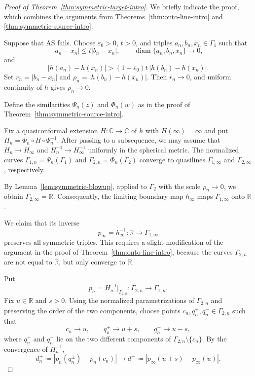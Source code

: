\documentclass[10pt,a4paper]{amsart}
\numberwithin{equation}{section}
\newcommand{\R}{\mathbb{R}}
\newcommand{\C}{\mathbb{C}}
\newcommand{\diam}{\operatorname{diam}}
\begin{document}
\begin{proof}[Proof of Theorem~\ref{thm:symmetric-target-intro}]
We briefly indicate the proof, which combines the arguments from Theorems~\ref{thm:onto-line-intro} and \ref{thm:symmetric-source-intro}.

Suppose that $\mathrm{AS}$ fails.  Choose $\varepsilon_0>0$, $t>0$, and triples $a_n,b_n,x_n\in\Gamma_1$ such that
\begin{equation}\label{eq:sym-target-failure}
 |a_n-x_n|\leq t|b_n-x_n|,\qquad \diam\{a_n,b_n,x_n\}\to0,
\end{equation}
and
\begin{equation}\label{eq:sym-target-image-failure}
 |h(a_n)-h(x_n)|>(1+\varepsilon_0)t\,|h(b_n)-h(x_n)|.
\end{equation}
Set $r_n=|b_n-x_n|$ and $\rho_n=|h(b_n)-h(x_n)|$.
Then $r_n\to0$, and uniform continuity of $h$ gives $\rho_n\to 0$.

Define the similarities $\Psi_n(z)$ and $\Phi_n(w)$ as in the proof of
Theorem~\ref{thm:symmetric-source-intro}.

Fix a quasiconformal extension $H\colon\C\to\C $ of $h$ with $H(\infty)=\infty$ and put $H_n=\Phi_n\circ H\circ \Psi_n^{-1}$.
After passing to a subsequence, we may assume that $H_n\to H_\infty$ and $H_n^{-1}\to H_\infty^{-1}$ uniformly in the spherical metric. 
The normalized curves $\Gamma_{1,n}=\Psi_n(\Gamma_1)$ and $\Gamma_{2,n}=\Phi_n(\Gamma_2)$ converge to quasilines $\Gamma_{1,\infty}$ and $\Gamma_{2,\infty}$, respectively.

By Lemma~\ref{lem:symmetric-blowup}, applied to $\Gamma_2$ with the scale $\rho_n\to0$, we obtain $\Gamma_{2,\infty}=\R$.
Consequently, the limiting boundary map $h_\infty$ maps $\Gamma_{1,\infty}$ onto $\mathbb R$.

We claim that its inverse
\[
 p_\infty=h_\infty^{-1}\colon\R\to\Gamma_{1,\infty}
\]
preserves all symmetric  triples.  
This requires a slight modification of the argument in the proof of Theorem~\ref{thm:onto-line-intro}, because the curves $\Gamma_{2,n}$ are not equal to $\R$, but only converge to $\R$.

Put
\[
 p_n=H_n^{-1}|_{\Gamma_{2,n}}\colon\Gamma_{2,n}\to\Gamma_{1,n}.
\]
Fix $u\in\R$ and $s>0$.  
Using the normalized parametrizations of $\Gamma_{2,n}$ and preserving the order of the two components, choose points $c_n,q_n^+,q_n^-\in\Gamma_{2,n}$ such that
\[
 c_n\to u,\qquad q_n^+\to u+s,\qquad q_n^-\to u-s,
\]
where $q_n^+$ and $q_n^-$ lie on the two different components of $\Gamma_{2,n}\setminus\{c_n\}$.  
By the convergence of $H_n^{-1}$,
\[
 d_n^\pm\coloneqq  |p_n(q_n^\pm)-p_n(c_n)|\to  d^\pm \coloneqq  |p_\infty(u\pm s)-p_\infty(u)|.
\]


\end{proof}
\end{document}
